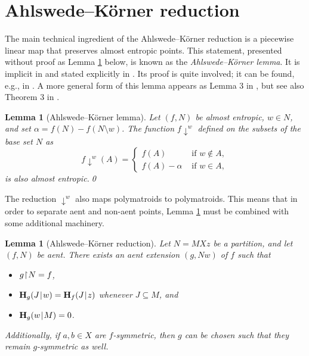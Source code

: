 \documentclass[10pt,a4paper]{amsart}
\def\|{\mskip1.5mu{|}\mskip1.5mu}
\def\H{\mathbf H}
\newcommand\restr{\mkern1mu{\upharpoonright}\mkern1mu}
\newcommand\dn{{\downarrow}}
\newtheorem{lemma}[theorem]{Lemma}
\begin{document}

\section{Ahlswede--K\"orner reduction}\label{sec:AK}

The main technical ingredient of the Ahlswede--K\"orner reduction is a
piecewise linear map that preserves almost entropic points. This statement,
presented without proof as Lemma \ref{lemma:down} below, is known as
the \emph{Ahlswede--K\"orner lemma}. It is implicit in \cite{AK}
and stated explicitly in \cite{Kaced}. Its proof is quite involved; it can
be found, e.g., in \cite[Lemma 5]{MMRV}. A more general form of this lemma
appears as Lemma 3 in \cite{entreg}, but see also Theorem 3 in \cite{fmtwocon}.

\begin{lemma}[Ahlswede--K\"orner lemma]\label{lemma:down}
Let $(f,N)$ be almost entropic, $w\in N$, and set $\alpha=f(N)-f(N\setminus w)$.
The function $f\dn^w$ defined on the subsets of the base set $N$ as
$$
    f\dn^w (A) = \begin{cases}
       f(A) & \mbox{ if $w\notin A$}, \\
       f(A)-\alpha & \mbox{ if $w\in A$},
    \end{cases}
$$
is also almost entropic.\qed
\end{lemma}

The reduction $\dn^w$ also maps polymatroids to polymatroids. This means
that in order to separate aent and non-aent points, Lemma \ref{lemma:down}
must be combined with some additional machinery.

\begin{lemma}[Ahlswede--K\"orner reduction]\label{lemma:AK}
Let $N=MXz$ be a partition, and let $(f,N)$ be aent. There exists an 
aent extension $(g,Nw)$ of $f$ such that
\begin{itemize}
\item[a)] $g\restr N = f$,
\item[b)] $\H_g(J\|w)=\H_f(J\|z)$ whenever $J\subseteq M$, and
\item[c)] $\H_g(w\|M)=0$.
\end{itemize}
Additionally, if $a,b\in X$ are $f$-symmetric, then $g$ can be chosen 
such that they remain $g$-symmetric as well.
\end{lemma}
\end{document}
